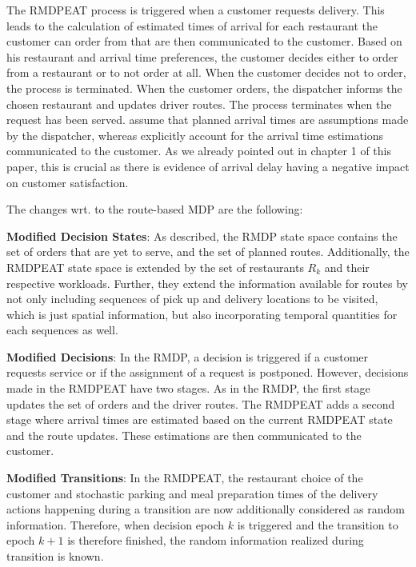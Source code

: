 The RMDPEAT process is triggered when a customer requests delivery. This leads to the calculation of estimated times of arrival for each restaurant the customer can order from that are then communicated to the customer. Based on his restaurant and arrival time preferences, the customer decides either to order from a restaurant or to not order at all. When the customer decides not to order, the process is terminated. When the customer orders, the dispatcher informs the chosen restaurant and updates driver routes. The process terminates when the request has been served. 
\cite{UlmerBarrett2017_TWAP} assume that planned arrival times are assumptions made by the dispatcher, whereas \cite{Hildebrandt2020_EAT} explicitly account for the arrival time estimations communicated to the customer. As we already pointed out in chapter 1 of this paper, this is crucial as there is evidence of arrival delay having a negative impact on customer satisfaction.

The changes wrt. to the route-based MDP are the following:
\begin{description}[font=$\bullet$\scshape\bfseries]
	\item \textbf{Modified Decision States}: As described, the RMDP state space contains the set of orders that are yet to serve, and the set of planned routes. Additionally, the RMDPEAT state space is extended by the set of restaurants $ R_k $ and their respective workloads. Further, they extend the information available for routes by not only including sequences of pick up and delivery locations to be visited, which is just spatial information, but also incorporating temporal quantities for each sequences as well. 
	\item \textbf{Modified Decisions}: 
	In the RMDP, a decision is triggered if a customer requests service or if the assignment of a request is postponed. However, decisions made in the RMDPEAT have two stages. As in the RMDP, the first stage updates the set of orders and the driver routes. The RMDPEAT adds a second stage where arrival times are estimated based on the current RMDPEAT state and the route updates. These estimations are then communicated to the customer.  
	\item \textbf{Modified Transitions}: In the RMDPEAT, the restaurant choice of the customer and stochastic parking and meal preparation times of the delivery actions happening during a transition are now additionally considered as random information. Therefore, when decision epoch $ k $ is triggered and the transition to epoch $ k+1 $ is therefore finished, the random information realized during transition is known. 
\end{description}

